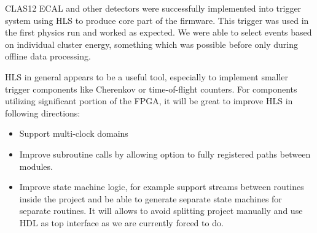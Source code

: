 CLAS12 ECAL and other detectors were successfully implemented into trigger system using HLS to produce core part of the firmware. This trigger was used in the first physics run and worked as expected. We were able to select events based on individual cluster energy, something which was possible before only during offline data processing.

HLS in general appears to be a useful tool, especially to implement smaller trigger components like Cherenkov or time-of-flight counters. For components utilizing significant portion of the FPGA, it will be great to improve HLS in following directions:

\begin{itemize}
	\item Support multi-clock domains
	\item Improve subroutine calls by allowing option to fully registered paths between modules. 
	\item Improve state machine logic, for example support streams between routines inside the project and be able to generate separate state machines for separate routines. It will allows to avoid splitting project manually and use HDL as top interface as we are currently forced to do.
\end{itemize}
